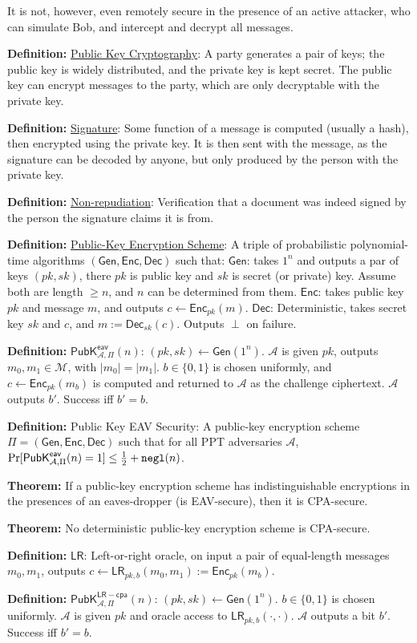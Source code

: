 \documentclass[10pt]{article}
\newcommand{\AAA}{\mathcal{A}}
\newcommand{\MMM}{\mathcal{M}}
\newcommand{\LR}{\mathsf{LR}}
\newcommand{\defn}[1]{{\bf Definition:} \underline{#1}}
\newcommand{\thm}[1]{{\bf Theorem:} \underline{#1}}
\newcommand{\Enc}{\mathsf{Enc}}
\newcommand{\Dec}{\mathsf{Dec}}
\newcommand{\Gen}{\mathsf{Gen}}
\newcommand{\GenEncDec}{(\Gen,\Enc,\Dec)}
\newcommand{\ExptPubEavArgs}[2]{\mathsf{PubK}^{\mathsf{eav}}_{#1,#2}}
\newcommand{\ExptPubCpaArgs}[2]{\mathsf{PubK}^{\mathsf{LR-cpa}}_{#1,#2}}
\newcommand{\ExptPubEav}{\ExptPubEavArgs{\AAA}{\Pi}}
\newcommand{\ExptPubCpa}{\ExptPubCpaArgs{\AAA}{\Pi}}
\newcommand{\negl}{{\tt negl}}
\newcommand{\from}{\leftarrow}
\begin{document}
\begin{multicols}{4}
It is not, however, even remotely secure in the presence of an active attacker, who can simulate Bob, and intercept and decrypt all messages.

\defn{Public Key Cryptography}: A party generates a pair of keys; the public key is widely distributed, and the private key is kept secret. The public key can encrypt messages to the party, which are only decryptable with the private key.

\defn{Signature}: Some function of a message is computed (usually a hash), then encrypted using the private key. It is then sent with the message, as the signature can be decoded by anyone, but only produced by the person with the private key.

\defn{Non-repudiation}: Verification that a document was indeed signed by the person the signature claims it is from.

\defn{Public-Key Encryption Scheme}: A triple of probabilistic polynomial-time algorithms $\GenEncDec$ such that: $\Gen$: takes $1^n$ and outputs a par of keys $(pk,sk)$, there $pk$ is public key and $sk$ is secret (or private) key. Assume both are length $\geq n$, and $n$ can be determined from them. $\Enc$: takes public key $pk$ and message $m$, and outputs $c\from\Enc_{pk}(m)$. $\Dec$: Deterministic, takes secret key $sk$ and $c$, and $m:=\Dec_{sk}(c)$. Outputs $\perp$ on failure.

\defn{$\ExptPubEav(n)$}: $(pk,sk)\from\Gen(1^n)$. $\AAA$ is given $pk$, outputs $m_0,m_1\in\MMM$, with $|m_0|=|m_1|$. $b\in\{0,1\}$ is chosen uniformly, and $c\from\Enc_{pk}(m_b)$ is computed and returned to $\AAA$ as the challenge ciphertext. $\AAA$ outputs $b'$. Success iff $b'=b$.

\defn{} Public Key EAV Security: A public-key encryption scheme $\Pi=\GenEncDec$ such that for all PPT adversaries $\AAA$, $\Pr[\ExptPubEav(n)=1]\leq\frac{1}{2}+\negl(n)$.

\thm{} If a public-key encryption scheme has indistinguishable encryptions in the presences of an eaves-dropper (is EAV-secure), then it is CPA-secure.

\thm{}No deterministic public-key encryption scheme is CPA-secure.

\defn{$\LR$}: Left-or-right oracle, on input a pair of equal-length messages $m_0,m_1$, outputs $c\from\LR_{pk,b}(m_0,m_1):=\Enc_{pk}(m_b)$.

\defn{$\ExptPubCpa(n)$}: $(pk,sk)\from\Gen(1^n)$. $b\in\{0,1\}$ is chosen uniformly. $\AAA$ is given $pk$ and oracle access to $\LR_{pk,b}(\cdot,\cdot)$. $\AAA$ outputs a bit $b'$. Success iff $b'=b$.


\end{multicols}
\end{document}
